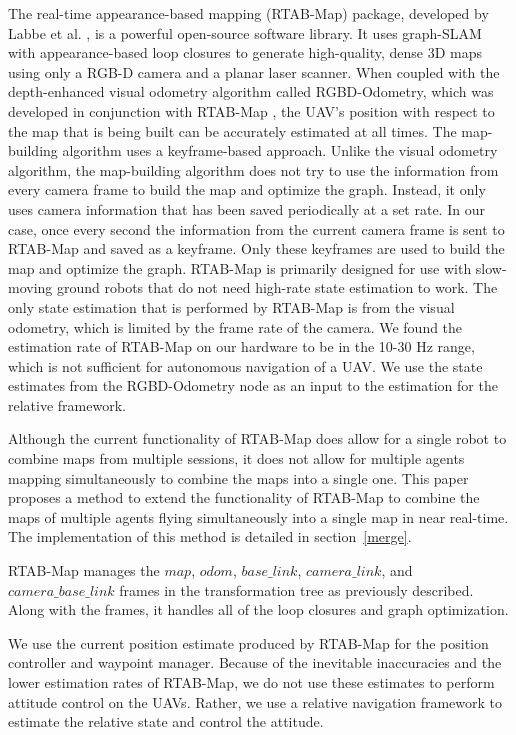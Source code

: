 \documentclass[letterpaper, 10 pt, conference]{ieeeconf}  %
\begin{document}
The real-time appearance-based mapping (RTAB-Map) package, developed by Labbe et al. \cite{Labbe2011,Labbe2013,Labbe2019}, is a powerful open-source software library. It uses graph-SLAM with appearance-based loop closures to generate high-quality, dense 3D maps using only a RGB-D camera and a planar laser scanner. When coupled with the depth-enhanced visual odometry algorithm called RGBD-Odometry, which was developed in conjunction with RTAB-Map \cite{Labbe2019}, the UAV's position with respect to the map that is being built can be accurately estimated at all times. The map-building algorithm uses a keyframe-based approach. Unlike the visual odometry algorithm, the map-building algorithm does not try to use the information from every camera frame to build the map and optimize the graph. Instead, it only uses camera information that has been saved periodically at a set rate. In our case, once every second the information from the current camera frame is sent to RTAB-Map and saved as a keyframe. Only these keyframes are used to build the map and optimize the graph. RTAB-Map is primarily designed for use with slow-moving ground robots that do not need high-rate state estimation to work. The only state estimation that is performed by RTAB-Map is from the visual odometry, which is limited by the frame rate of the camera. We found the estimation rate of RTAB-Map on our hardware to be in the 10-30 Hz range, which is not sufficient for autonomous navigation of a UAV. We use the state estimates from the RGBD-Odometry node as an input to the estimation for the relative framework.

Although the current functionality of RTAB-Map does allow for a single robot to combine maps from multiple sessions, it does not allow for multiple agents mapping simultaneously to combine the maps into a single one. This paper proposes a method to extend the functionality of RTAB-Map to combine the maps of multiple agents flying simultaneously into a single map in near real-time. The implementation of this method is detailed in section~\ref{merge}.

RTAB-Map manages the $\mathit{map}$, $\mathit{odom}$, $\mathit{base\_link}$, $\mathit{camera\_link}$, and $\mathit{camera\_base\_link}$ frames in the transformation tree as previously described. Along with the frames, it handles all of the loop closures and graph optimization.

We use the current position estimate produced by RTAB-Map for the position controller and waypoint manager. Because of the inevitable inaccuracies and the lower estimation rates of RTAB-Map, we do not use these estimates to perform attitude control on the UAVs. Rather, we use a relative navigation framework to estimate the relative state and control the attitude.
\end{document}
